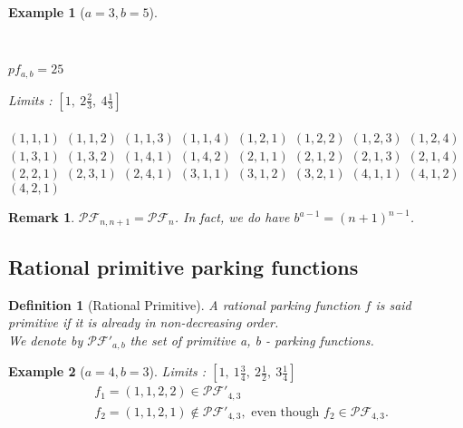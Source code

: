 \documentclass[12pt]{report}
\newtheorem{definition}{Definition}
\newtheorem*{example}{Example}
\newtheorem*{rem}{Remark}
\begin{document}
\begin{example}[$a = 3, b = 5$]
    ~\\
    \begin{itemize*}\\
        \item $pf_{a,b} = 25$
        \item Limits : $[1,\ 2 \frac{2}{3},\ 
            4 \frac{1}{3}]$\\\\
        \subitem $(1, 1, 1)$
        \subitem $(1, 1, 2)$
        \subitem $(1, 1, 3)$
        \subitem $(1, 1, 4)$
        \subitem $(1, 2, 1)$
        \subitem $(1, 2, 2)$
        \subitem $(1, 2, 3)$
        \subitem $(1, 2, 4)$
        \subitem $(1, 3, 1)$
        \subitem $(1, 3, 2)$
        \subitem $(1, 4, 1)$
        \subitem $(1, 4, 2)$
        \subitem $(2, 1, 1)$
        \subitem $(2, 1, 2)$
        \subitem $(2, 1, 3)$
        \subitem $(2, 1, 4)$
        \subitem $(2, 2, 1)$
        \subitem $(2, 3, 1)$
        \subitem $(2, 4, 1)$
        \subitem $(3, 1, 1)$
        \subitem $(3, 1, 2)$
        \subitem $(3, 2, 1)$
        \subitem $(4, 1, 1)$
        \subitem $(4, 1, 2)$
        \subitem $(4, 2, 1)$
    \end{itemize*}
\end{example}

\begin{rem}    
    $\mathcal{PF}_{n, n+1} = \mathcal{PF}_n$.
    In fact, we do have $b^{a-1} = (n+1)^{n-1}$.
\end{rem}

\subsection{Rational primitive parking functions}

\begin{definition}[Rational Primitive]
    A rational parking function $f$ is said
    \emph{primitive} if it is already in
    non-decreasing order.\\
    We denote by $\mathcal{PF'}_{a,b}$ the set of
    primitive a, b - parking functions.
\end{definition}

\begin{example}[$a = 4, b = 3$]
    Limits : $[1,\ 1 \frac{3}{4},\ 2 \frac{1}{2},\ 
    3 \frac{1}{4}]$
    \begin{align*}
        &f_1 = (1, 1, 2, 2) \in \mathcal{PF'}_{4,3}\\
        &f_2 = (1, 1, 2, 1) \notin \mathcal{PF'}_{4,3},
        \text{ even though } f_2 \in \mathcal{PF}_{4,3}.
    \end{align*}
\end{example}
\end{document}
